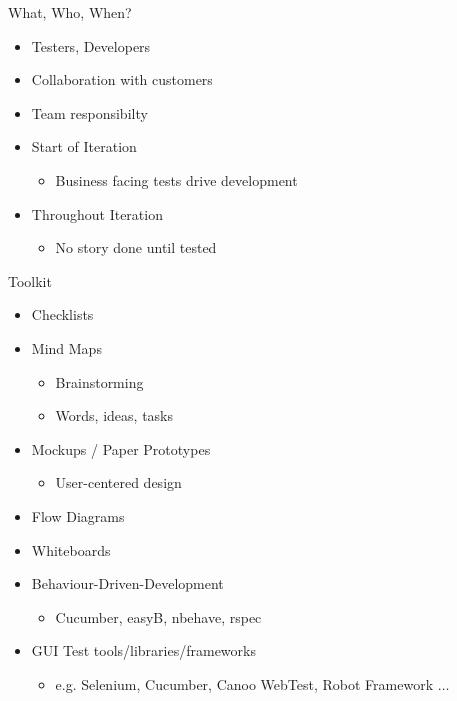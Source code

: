 \documentclass[10pt,t,a4paper]{beamer}
\begin{document}
\begin{frame}[label=sec-6]{What, Who, When?}
\begin{itemize}
\item Testers, Developers
\item Collaboration with customers
\item Team responsibilty
\item Start of Iteration
\begin{itemize}
\item Business facing tests drive development
\end{itemize}
\item Throughout Iteration
\begin{itemize}
\item No story done until tested
\end{itemize}
\end{itemize}
\end{frame}
\begin{frame}[label=sec-7]{Toolkit}
\begin{itemize}
\item Checklists
\item Mind Maps
\begin{itemize}
\item Brainstorming
\item Words, ideas, tasks
\end{itemize}
\item Mockups / Paper Prototypes
\begin{itemize}
\item User-centered design
\end{itemize}
\item Flow Diagrams
\item Whiteboards
\item Behaviour-Driven-Development
\begin{itemize}
\item Cucumber, easyB, nbehave, rspec
\end{itemize}
\item GUI Test tools/libraries/frameworks
\begin{itemize}
\item e.g. Selenium, Cucumber, Canoo WebTest, Robot Framework $\ldots$
\end{itemize}
\end{itemize}
\end{frame}
\end{document}
